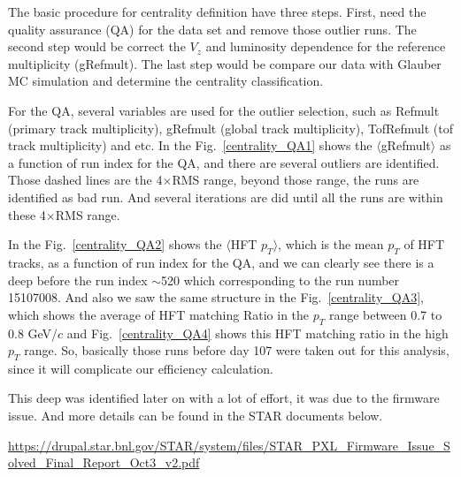 \documentclass[a4paper]{article}
\begin{document}
The basic procedure for centrality definition have three steps. First, need the quality assurance (QA) for the data set and remove those outlier runs. The second step would be correct the $V_{z}$ and luminosity dependence for the reference multiplicity (gRefmult). The last step would be compare our data with Glauber MC simulation and determine the centrality classification.

For the QA, several variables are used for the outlier selection, such as Refmult (primary track multiplicity), gRefmult (global track multiplicity), TofRefmult (tof track multiplicity) and etc. In the Fig.~\ref{centrality_QA1} shows the $\langle$gRefmult$\rangle$ as a function of run index for the QA, and there are several outliers are identified. Those dashed lines are the 4$\times$RMS range, beyond those range, the runs are identified as bad run. And several iterations are did until all the runs are within these 4$\times$RMS range.


In the Fig.~\ref{centrality_QA2} shows the $\langle$HFT $p_{T}$$\rangle$, which is the mean $p_{T}$ of HFT tracks, as a function of run index for the QA, and we can clearly see there is a deep before the run index $\sim$520 which corresponding to the run number 15107008. And also we saw the same structure in the Fig.~\ref{centrality_QA3}, which shows the average of HFT matching Ratio in the $p_{T}$ range between 0.7 to 0.8 GeV/$c$ and Fig.~\ref{centrality_QA4} shows this HFT matching ratio in the high $p_{T}$ range. So, basically those runs before day 107 were taken out for this analysis, since it will complicate our efficiency calculation.

This deep was identified later on with a lot of effort, it was due to the firmware issue. And more details can be found in the STAR documents below.

\url{https://drupal.star.bnl.gov/STAR/system/files/STAR_PXL_Firmware_Issue_Solved_Final_Report_Oct3_v2.pdf}
\end{document}
